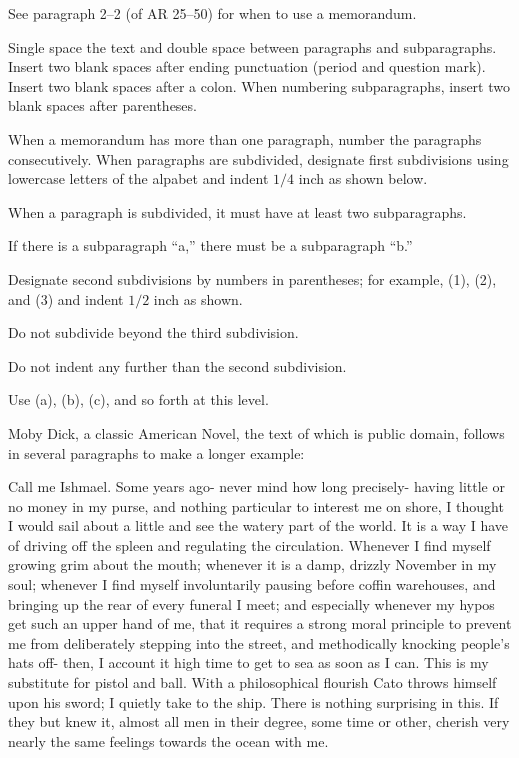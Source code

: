 \documentclass{armymemo}
\begin{document}
\AMsethead{}

\Ni{} See paragraph 2--2 (of AR 25--50) for when to use a memorandum.

\Ni{} Single space the text and double space between paragraphs and
subparagraphs. Insert two blank spaces after ending punctuation (period and
question mark). %
Insert two blank spaces after a colon. When numbering subparagraphs, insert two
blank spaces after parentheses.

\Ni{} When a memorandum has more than one paragraph, number the paragraphs
consecutively. When paragraphs are subdivided, designate first subdivisions
using lowercase letters of the alpabet and indent $1/4$ inch as shown below.

\Nii{} When a paragraph is subdivided, it must have at least two subparagraphs.

\Nii{} If there is a subparagraph ``a,'' there must be a subparagraph ``b.''

\Niii{} Designate second subdivisions by numbers in parentheses; for example, (1),
(2), and (3) and indent $1/2$ inch as shown.

\Niii{} Do not subdivide beyond the third subdivision.

\Niiii{} Do not indent any further than the second subdivision.

\Niiii{} Use (a), (b), (c), and so forth at this level.

\Ni{} Moby Dick, a classic American Novel, the text of which is public domain,
follows in several paragraphs to make a longer example:

\Nii{} Call me Ishmael. Some years ago- never mind how long precisely- having little or
no money in my purse, and nothing particular to interest me on shore, I thought
I would sail about a little and see the watery part of the world. It is a way I
have of driving off the spleen and regulating the circulation. Whenever I find
myself growing grim about the mouth; whenever it is a damp, drizzly November in
my soul; whenever I find myself involuntarily pausing before coffin warehouses,
and bringing up the rear of every funeral I meet; and especially whenever my
hypos get such an upper hand of me, that it requires a strong moral principle to
prevent me from deliberately stepping into the street, and methodically knocking
people's hats off- then, I account it high time to get to sea as soon as I can.
This is my substitute for pistol and ball. With a philosophical flourish Cato
throws himself upon his sword; I quietly take to the ship. There is nothing
surprising in this. If they but knew it, almost all men in their degree, some
time or other, cherish very nearly the same feelings towards the ocean with me.
\end{document}
